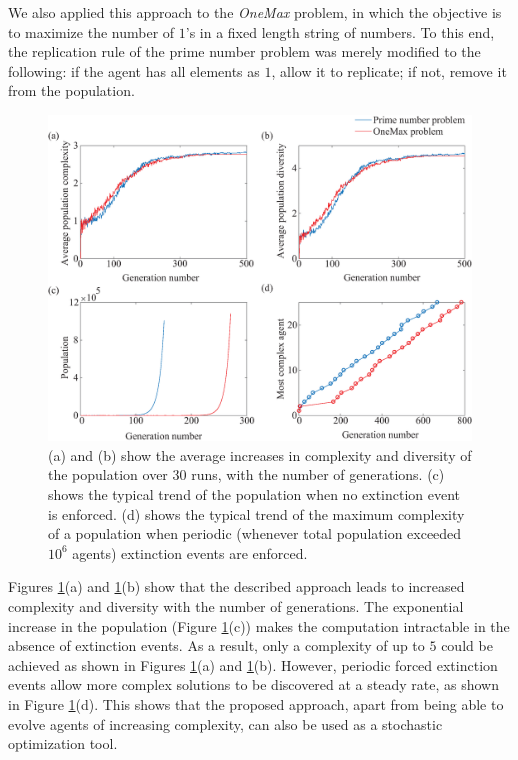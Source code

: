 We also applied this approach to the \emph{OneMax} problem, 
in which the objective is to maximize the number of $1$'s in a fixed length string of numbers. To this end, the replication rule of the prime number problem was merely modified to the following: if the agent has all elements as $1$, allow it to replicate; if not, remove it from the population.
\begin{figure}[ht]
\centering
\includegraphics[width=1\linewidth]{figfile2.eps}
\caption{(a) and (b) show the average increases in complexity and diversity of the population over $30$ runs, with the number of generations. (c) shows the typical trend of the population when no extinction event is enforced. (d) shows the typical trend of the maximum complexity of a population when periodic (whenever total population exceeded $10^{6}$ agents) extinction events are enforced.
} 
\label{fig:results}
\end{figure} 

Figures \ref{fig:results}(a) and \ref{fig:results}(b) show that the described approach leads to increased complexity and diversity with the number of generations. The exponential increase in the population (Figure \ref{fig:results}(c)) makes the computation intractable in the absence of extinction events. As a result, only a complexity of up to $5$ could be achieved as shown in Figures \ref{fig:results}(a) and \ref{fig:results}(b). However, periodic forced extinction events allow more complex solutions to be discovered at a steady rate, as shown in Figure \ref{fig:results}(d). This shows that the proposed approach, apart from being able to evolve agents of increasing complexity, can also be used as a stochastic optimization tool.
 
